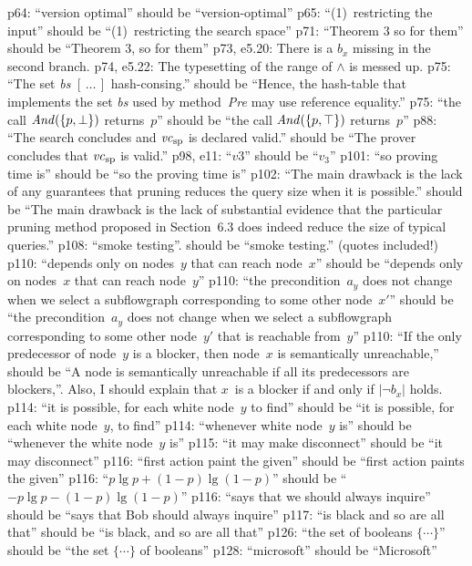 \e p64: ``version optimal'' should be ``version-optimal''
\e p65: ``(1)~restricting the input'' should be ``(1)~restricting the
  search space''
\e p71: ``Theorem 3 so for them'' should be ``Theorem 3, so for them''
\e p73, e5.20: There is a $b_x$ missing in the second branch.
\e p74, e5.22: The typesetting of the range of $\land$ is messed up.
\e p75: ``The set {\it bs\/} $[\,\ldots\,]$ hash-consing.'' should be ``Hence, the
  hash-table that implements the set {\it bs\/} used by method~{\it Pre} may
  use reference equality.''
\e p75: ``the call ${\it And}(\{p,\bot\})$ returns~$p$'' should be
  ``the call ${\it And}(\{p,\top\})$ returns~$p$''
\e p88: ``The search concludes and ${\it vc}_{\rm sp}$ is declared valid.''
  should be ``The prover concludes that ${\it vc}_{\rm sp}$ is valid.''
\e p98, e11: ``$v3$'' should be ``$v_3$''
\e p101: ``so proving time is'' should be ``so the proving time is'' 
\e p102: ``The main drawback is the lack of any guarantees that pruning
  reduces the query size when it is possible.'' should be ``The main
  drawback is the lack of substantial evidence that the particular 
  pruning method proposed in Section~6.3 does indeed reduce the size
  of typical queries.''
\e p108: ``smoke testing''. should be ``smoke testing.'' (quotes included!)
\e p110: ``depends only on nodes~$y$ that can reach node~$x$'' should be
  ``depends only on nodes~$x$ that can reach node~$y$''
\e p110: ``the precondition~$a_y$ does not change when we select a
  subflowgraph corresponding to some other node~$x'$'' should be
  ``the precondition~$a_y$ does not change when we select a subflowgraph
  corresponding to some other node~$y'$ that is reachable from~$y$''
\e p110: ``If the only predecessor of node~$y$ is a blocker, then node~$x$
  is semantically unreachable,'' should be ``A node is semantically
  unreachable if all its predecessors are blockers,''. Also, I should
  explain that $x$~is a blocker if and only if $|\lnot b_x|$ holds.
\e p114: ``it is possible, for each white node~$y$ to find'' should be
  ``it is possible, for each white node~$y$, to find''
\e p114: ``whenever white node~$y$ is'' should be ``whenever the white
  node~$y$ is''
\e p115: ``it may make disconnect'' should be ``it may disconnect''
\e p116: ``first action paint the given'' should be ``first action paints
  the given''
\e p116: ``$p\lg p+(1-p)\lg(1-p)$'' should be ``$-p\lg p-(1-p)\lg(1-p)$''
\e p116: ``says that we should always inquire'' should be ``says that Bob
  should always inquire''
\e p117: ``is black and so are all that'' should be ``is black, and so are 
  all that''
\e p126: ``the set of booleans $\{\cdots\}$'' should be ``the set $\{\cdots\}$
  of booleans''
\e p128: ``microsoft'' should be ``Microsoft''

\bye
